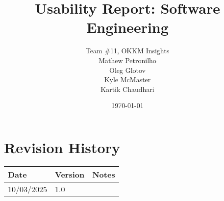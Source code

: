 \documentclass[12pt, titlepage]{article}
\begin{document}
\title{Usability Report: Software Engineering} 
\author{Team \#11, OKKM Insights\\
Mathew Petronilho\\
Oleg Glotov\\
Kyle McMaster\\
Kartik Chaudhari}
\date{\today}
	
\maketitle


\section{Revision History}

\begin{tabularx}{\textwidth}{p{3cm}p{2cm}X}
\toprule {\bf Date} & {\bf Version} & {\bf Notes}\\
\midrule
10/03/2025 & 1.0 &\\
\bottomrule
\end{tabularx}


\tableofcontents
\end{document}

